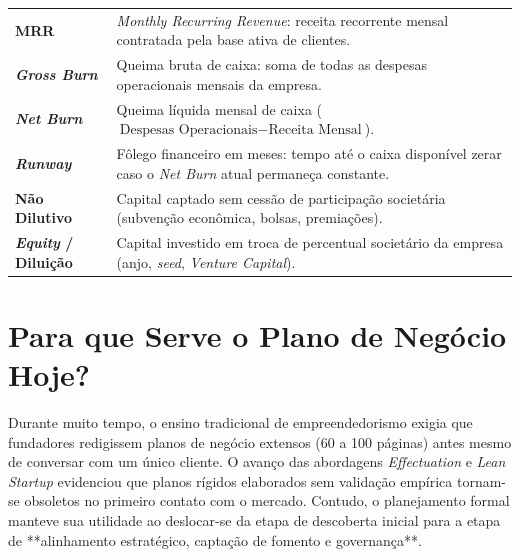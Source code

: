 
\begin{boxSimbolo}
  \begin{tabularx}{\textwidth}{@{}l >{\raggedright\arraybackslash}X@{}}
    \textbf{MRR} & \textit{Monthly Recurring Revenue}: receita recorrente mensal contratada pela base ativa de clientes. \\
    \textbf{\textit{Gross Burn}} & Queima bruta de caixa: soma de todas as despesas operacionais mensais da empresa. \\
    \textbf{\textit{Net Burn}} & Queima líquida mensal de caixa ($\text{Despesas Operacionais} - \text{Receita Mensal}$). \\
    \textbf{\textit{Runway}} & Fôlego financeiro em meses: tempo até o caixa disponível zerar caso o \textit{Net Burn} atual permaneça constante. \\
    \textbf{Não Dilutivo} & Capital captado sem cessão de participação societária (subvenção econômica, bolsas, premiações). \\
    \textbf{\textit{Equity} / Diluição} & Capital investido em troca de percentual societário da empresa (anjo, \textit{seed}, \textit{Venture Capital}). \\
  \end{tabularx}
\end{boxSimbolo}

\section{Para que Serve o Plano de Negócio Hoje?}

Durante muito tempo, o ensino tradicional de empreendedorismo exigia que fundadores redigissem planos de negócio extensos (60 a 100 páginas) antes mesmo de conversar com um único cliente. O avanço das abordagens \textit{Effectuation} e \textit{Lean Startup} evidenciou que planos rígidos elaborados sem validação empírica tornam-se obsoletos no primeiro contato com o mercado. Contudo, o planejamento formal manteve sua utilidade ao deslocar-se da etapa de descoberta inicial para a etapa de **alinhamento estratégico, captação de fomento e governança**.

